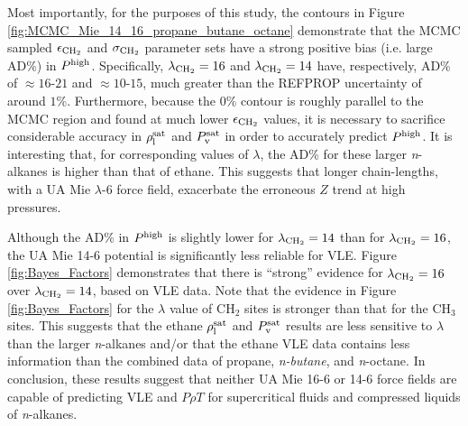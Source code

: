 \documentclass[preprint,letterpaper,floatfix,citeautoscript,aip,jcp]{revtex4-1}
\begin{document}
Most importantly, for the purposes of this study, the contours in Figure \ref{fig:MCMC_Mie_14_16_propane_butane_octane} demonstrate that 
the MCMC sampled $\epsilon_{\rm CH_2}$ and $\sigma_{\rm CH_2}$ parameter sets have a strong positive bias (i.e. large AD\%) in $P^{\rm high}$. Specifically, $\lambda_{\rm CH_2} = 16$ and $\lambda_{\rm CH_2} = 14$ have, respectively, AD\% of $\approx 16$-$21$ and $\approx 10$-$15$, much greater than the REFPROP uncertainty of around $1$\%. 
Furthermore, because the 0\% contour is roughly parallel to the MCMC region and found at much lower $\epsilon_{\rm CH_2}$ values, it is necessary to sacrifice considerable accuracy in $\rho_{\rm l}^{\rm sat}$ and $P_{\rm v}^{\rm sat}$ in order to accurately predict $P^{\rm high}$. 
It is interesting that, for corresponding values of $\lambda$, the AD\% for these larger \textit{n}-alkanes is higher than that of ethane. This suggests that longer chain-lengths, with a UA Mie $\lambda$-6 force field, exacerbate the erroneous $Z$ trend at high pressures.


Although the AD\% in $P^{\rm high}$ is slightly lower for $\lambda_{\rm CH_2} = 14$ than for $\lambda_{\rm CH_2} = 16$, the UA Mie 14-6 potential is significantly less reliable for VLE. Figure \ref{fig:Bayes_Factors} demonstrates that there is ``strong'' evidence for $\lambda_{\rm CH_2} = 16$ over $\lambda_{\rm CH_2} = 14$, based on VLE data. 
Note that the evidence in Figure \ref{fig:Bayes_Factors} for the $\lambda$ value of CH$_2$ sites is stronger than that for the CH$_3$ sites. This suggests that the ethane $\rho_{\rm l}^{\rm sat}$ and $P_{\rm v}^{\rm sat}$ results are less sensitive to $\lambda$ than the larger \textit{n}-alkanes and/or that the ethane VLE data contains less information than the combined data of propane, \textit{n-butane}, and \textit{n}-octane.
In conclusion, these results suggest that neither UA Mie 16-6 or 14-6 force fields are capable of predicting VLE and $P \rho T$ for supercritical fluids and compressed liquids of \textit{n}-alkanes. 
\end{document}
